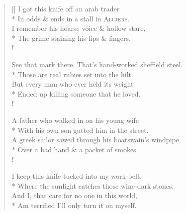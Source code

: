 \settowidth{\versewidth}{Where the sunlight catches those wine-dark stones.}
\begin{verse}[\versewidth]
I got this knife off an arab trader\\*
\vin In odds \& ends in a stall in \textsc{Algiers}.\\
I remember his hoarse voice \& hollow stare,\\*
\vin The grime staining his lips \& fingers.\\!

See that mark there. That's hand-worked sheffield steel.\\*
\vin Those are real rubies set into the hilt.\\
But every man who ever held its weight\\*
\vin Ended up killing someone that he loved.\\!

A father who walked in on his young wife\\*
\vin With his own son gutted him in the street.\\
A greek sailor sawed through his boatswain's windpipe\\*
\vin Over a bad hand \& a packet of smokes.\\!

I keep this knife tucked into my work-belt,\\*
\vin Where the sunlight catches those wine-dark stones.\\
And I, that care for no one in this world,\\*
\vin Am terrified I'll only turn it on myself.
\end{verse}
